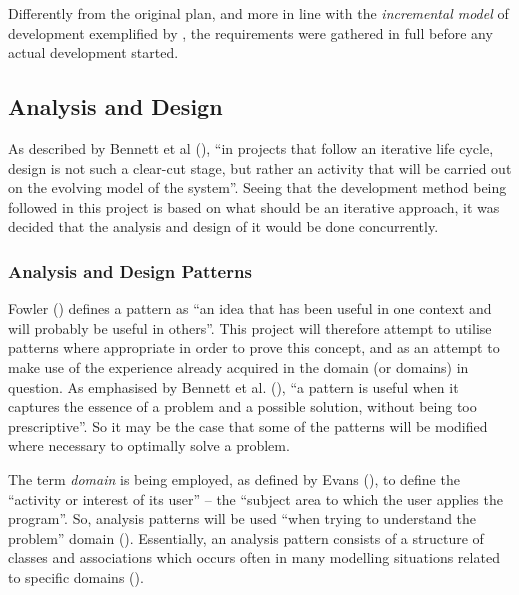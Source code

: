 Differently from the original plan, and more in line with the \emph{incremental
model} of development exemplified by \cite[][pp.~120-124]{dawson2009projects},
the requirements were gathered in full before any actual development started.

\subsection{Analysis and Design} 
As described by Bennett et al (\citeyear[][p.~348]{bennett2010object}), ``in
projects that follow an iterative life cycle, design is not such a clear-cut
stage, but rather an activity that will be carried out on the evolving model of
the system''. Seeing that the development method being followed in this project
is based on what should be an iterative approach, it was decided that the
analysis and design of it would be done concurrently.

\subsubsection{Analysis and Design Patterns}
Fowler (\citeyear[][Section~1.3]{fowler1997analysis}) defines a pattern as ``an
idea that has been useful in one context and will probably be useful in
others''. This project will therefore attempt to utilise patterns where
appropriate in order to prove this concept, and as an attempt to make use of
the experience already acquired in the domain (or domains) in question. As
emphasised by Bennett et al. (\citeyear[][p.~252]{bennett2010object}), ``a
pattern is useful when it captures the essence of a problem and a possible
solution, without being too prescriptive''. So it may be the case that some of
the patterns will be modified where necessary to optimally solve a problem.

The term \emph{domain} is being employed, as defined by Evans
(\citeyear[][p.~2]{evans2004domain}), to define the ``activity or interest of
its user'' -- the ``subject area to which the user applies the program''.  
So, analysis patterns will be used ``when trying to understand the problem'' domain
(\cite[][Section~1.1]{fowler1997analysis}). Essentially, an analysis pattern
consists of a structure of classes and associations which occurs often in many
modelling situations related to specific domains
(\cite[][p.~254]{bennett2010object}).

